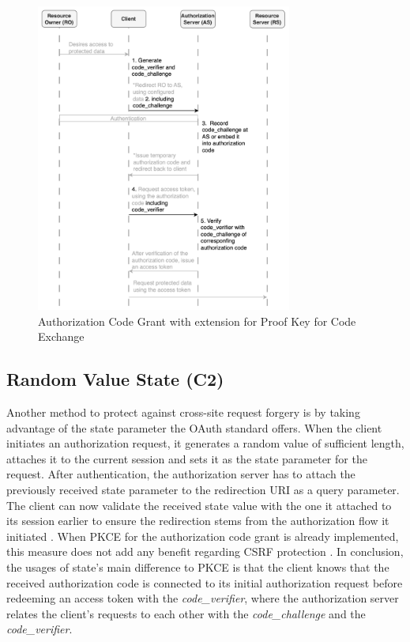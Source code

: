 \begin{figure}[H]
	\sffamily\footnotesize
	\includegraphics[width=0.75\textwidth]{pic/PKCE.png}
	\unitlength=0.75mm
	\linethickness{0.4pt}
	\caption{Authorization Code Grant with extension for Proof Key for Code Exchange}
	\label{fig:pkce}
\end{figure}

\subsection[Random Value State]{Random Value State (C2)}
\label{counter:C2}
Another method to protect against cross-site request forgery is by taking advantage of the state parameter the OAuth standard offers. When the client initiates an authorization request, it generates a random value of sufficient length, attaches it to the current session and sets it as the state parameter for the request. After authentication, the authorization server has to attach the previously received state parameter to the redirection URI as a query parameter. The client can now validate the received state value with the one it attached to its session earlier to ensure the redirection stems from the authorization flow it initiated \cite{ferry2015security}. When PKCE for the authorization code grant is already implemented, this measure does not add any benefit regarding CSRF protection \cite{bradley2015rfc}. In conclusion, the usages of state's main difference to PKCE is that the client knows that the received authorization code is connected to its initial authorization request before redeeming an access token with the \emph{code\_verifier}, where the authorization server relates the client's requests to each other with the \emph{code\_challenge} and the \emph{code\_verifier}.


